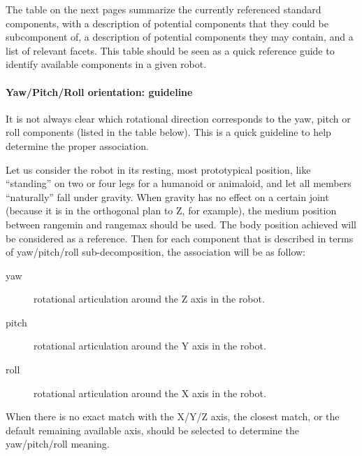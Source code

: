 The table on the next pages summarize the currently referenced standard
components, with a description of potential components that they could
be subcomponent of, a description of potential components they may
contain, and a list of relevant facets. This table should be seen as a
quick reference guide to identify available components in a given
robot.

\paragraph{Yaw/Pitch/Roll orientation: guideline}

It is not always clear which rotational direction corresponds to the
yaw, pitch or roll components (listed in the table below). This is a
quick guideline to help determine the proper association.

Let us consider the robot in its resting, most prototypical position,
like “standing” on two or four legs for a humanoid or animaloid, and
let all members “naturally” fall under gravity. When gravity has no
effect on a certain joint (because it is in the orthogonal plan to Z,
for example), the medium position between rangemin and rangemax should
be used. The body position achieved will be considered as a reference.
Then for each component that is described in terms of yaw/pitch/roll
sub-decomposition, the association will be as follow:

\begin{description}
\item[yaw] rotational articulation around the Z axis in the robot.
\item[pitch] rotational articulation around the Y axis in the robot.
\item[roll] rotational articulation around the X axis in the robot.
\end{description}

When there is no exact match with the X/Y/Z axis, the closest match, or
the default remaining available axis, should be selected to determine
the yaw/pitch/roll meaning.

\bigskip

\newcommand{\component}[5]
{
  \lstindex{#1} &
  #5 &
  \code{#2} &
  \code{#3} &
  \code{#4}\\\hline
}

